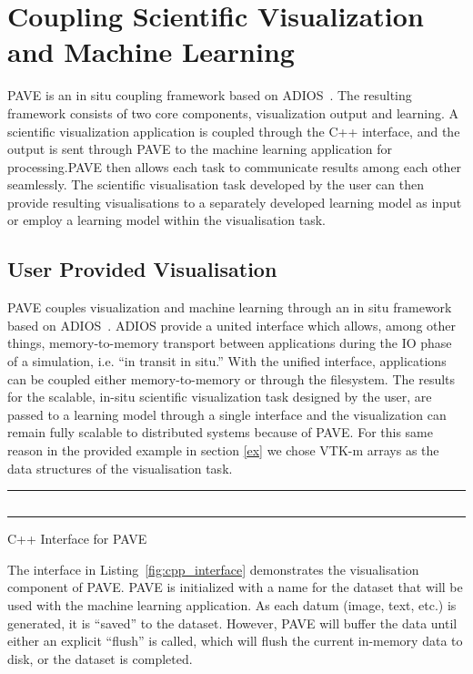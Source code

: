 \section{Coupling Scientific Visualization and Machine Learning}
PAVE is an in situ coupling framework based on ADIOS~\cite{doi:10.1002/cpe.3125}. The resulting framework consists of two core components, visualization output and learning. A scientific visualization application is coupled through the C++ interface, and the output is sent through PAVE to the machine learning application for processing.PAVE then allows each task to communicate results among each other seamlessly. The scientific visualisation task developed by the user can then provide resulting visualisations to a separately developed learning model as input or employ a learning model within the visualisation task.  



\subsection{User Provided Visualisation}

PAVE couples visualization and machine learning through an in situ framework based on ADIOS~\cite{doi:10.1002/cpe.3125}. ADIOS provide a united interface which allows, among other things, memory-to-memory transport between applications during the IO phase of a simulation, i.e. ``in transit in situ.'' With the  unified interface, applications can be coupled either memory-to-memory or through the filesystem. The results for the scalable, in-situ scientific visualization task designed by the user, are passed to a learning model through a single interface and the visualization can remain fully scalable to distributed systems because of PAVE. For this same reason in the provided example in section \ref{ex} we chose VTK-m arrays as the data structures of the visualisation task.

\begin{listing}[htb]
\noindent\rule{0.5\textwidth}{1pt}
\inputminted{cpp}{pave_pt.py}\label{PAVEvis}
\noindent\rule{0.5\textwidth}{1pt}
\caption{C++ Interface for PAVE}
\label{fig:cpp_interface}
\end{listing}

The interface in Listing~\ref{fig:cpp_interface} demonstrates the visualisation component of PAVE. PAVE is initialized with a name for the dataset that will be used with the machine learning application. As each datum (image, text, etc.) is generated, it is ``saved'' to the dataset. However, PAVE will buffer the data until either an explicit ``flush'' is called, which will flush the current in-memory data to disk, or the dataset is completed. 

